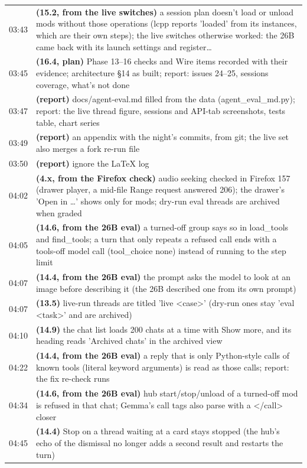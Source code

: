 \begin{longtable}{@{}l>{\raggedright\arraybackslash}p{14.2cm}@{}}
03:43 & \textbf{(15.2, from the live switches)} a session plan doesn't load or unload mods without those operations (lcpp reports 'loaded' from its instances, which are their own steps); the live switches otherwise worked: the 26B came back with its launch settings and register… \\
03:45 & \textbf{(16.4, plan)} Phase 13--16 checks and Wire items recorded with their evidence; architecture §14 as built; report: issues 24--25, sessions coverage, what's not done \\
03:47 & \textbf{(report)} docs/agent-eval.md filled from the data (agent\_eval\_md.py); report: the live thread figure, sessions and API-tab screenshots, tests table, chart series \\
03:49 & \textbf{(report)} an appendix with the night's commits, from git; the live set also merges a fork re-run file \\
03:50 & \textbf{(report)} ignore the LaTeX log \\
04:02 & \textbf{(4.x, from the Firefox check)} audio seeking checked in Firefox 157 (drawer player, a mid-file Range request answered 206); the drawer's 'Open in \ldots{}' shows only for mods; dry-run eval threads are archived when graded \\
04:05 & \textbf{(14.6, from the 26B eval)} a turned-off group says so in load\_tools and find\_tools; a turn that only repeats a refused call ends with a tools-off model call (tool\_choice none) instead of running to the step limit \\
04:07 & \textbf{(14.4, from the 26B eval)} the prompt asks the model to look at an image before describing it (the 26B described one from its own prompt) \\
04:07 & \textbf{(13.5)} live-run threads are titled 'live <case>' (dry-run ones stay 'eval <task>' and are archived) \\
04:10 & \textbf{(14.9)} the chat list loads 200 chats at a time with Show more, and its heading reads 'Archived chats' in the archived view \\
04:22 & \textbf{(14.4, from the 26B eval)} a reply that is only Python-style calls of known tools (literal keyword arguments) is read as those calls; report: the fix re-check runs \\
04:34 & \textbf{(14.6, from the 26B eval)} hub start/stop/unload of a turned-off mod is refused in that chat; Gemma's call tags also parse with a </call> closer \\
04:45 & \textbf{(14.4)} Stop on a thread waiting at a card stays stopped (the hub's echo of the dismissal no longer adds a second result and restarts the turn) \\

\end{longtable}
